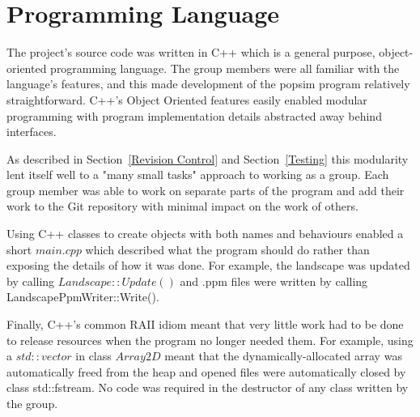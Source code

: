 \section{Programming Language}
\label{Programming Language}

The project's source code was written in C++ which is a general purpose, object-oriented programming language. 
The group members were all familiar with the language's features, and this made development of the popsim program relatively straightforward. 
C++'s Object Oriented features easily enabled modular programming with program implementation details abstracted away behind interfaces.

As described in Section~\ref{Revision Control} and Section~\ref{Testing} this modularity lent itself well to a "many small tasks" approach to working as a group.  
Each group member was able to work on separate parts of the program and add their work to the Git repository with minimal impact on the work of others.

Using C++ classes to create objects with both names and behaviours enabled a short $main.cpp$ which described what the program should do rather than exposing the details of how it was done.  
For example, the landscape was updated by calling $Landscape::Update()$ and .ppm files were written by calling LandscapePpmWriter::Write().

Finally, C++'s common RAII idiom meant that very little work had to be done to release resources when the program no longer needed them.  
For example, using a $std::vector$ in class $Array2D$ meant that the dynamically-allocated array was automatically freed from the heap and opened files were automatically closed by class std::fstream. 
No code was required in the destructor of any class written by the group.
